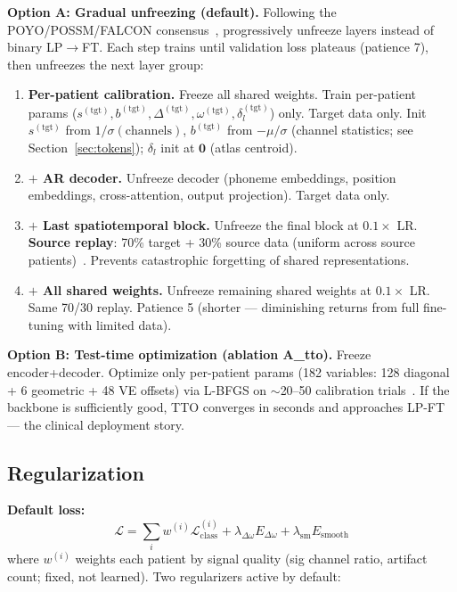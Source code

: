 \documentclass[11pt,letterpaper]{article}
\begin{document}
\textbf{Option A: Gradual unfreezing (default).} Following the POYO/POSSM/FALCON consensus~\cite{ryoo2025possm,karpowicz2024falcon}, progressively unfreeze layers instead of binary LP$\to$FT. Each step trains until validation loss plateaus (patience 7), then unfreezes the next layer group:
\begin{enumerate}[leftmargin=2em]
\item \textbf{Per-patient calibration.} Freeze all shared weights. Train per-patient params ($s^{(\text{tgt})}, b^{(\text{tgt})}, \Delta^{(\text{tgt})}, \omega^{(\text{tgt})}, \delta_l^{(\text{tgt})}$) only. Target data only. Init $s^{(\text{tgt})}$ from $1/\sigma(\text{channels})$, $b^{(\text{tgt})}$ from $-\mu/\sigma$ (channel statistics; see Section~\ref{sec:tokens}); $\delta_l$ init at $\mathbf{0}$ (atlas centroid).
\item \textbf{$+$ AR decoder.} Unfreeze decoder (phoneme embeddings, position embeddings, cross-attention, output projection). Target data only.
\item \textbf{$+$ Last spatiotemporal block.} Unfreeze the final block at $0.1\times$ LR. \textbf{Source replay}: 70\% target + 30\% source data (uniform across source patients)~\cite{levin2026}. Prevents catastrophic forgetting of shared representations.
\item \textbf{$+$ All shared weights.} Unfreeze remaining shared weights at $0.1\times$ LR. Same 70/30 replay. Patience 5 (shorter --- diminishing returns from full fine-tuning with limited data).
\end{enumerate}
\textbf{Option B: Test-time optimization (ablation A\_tto).} Freeze encoder+decoder. Optimize only per-patient params (182 variables: 128 diagonal + 6 geometric + 48 VE offsets) via L-BFGS on ${\sim}$20--50 calibration trials~\cite{hewitt2024}. If the backbone is sufficiently good, TTO converges in seconds and approaches LP-FT --- the clinical deployment story.

\subsection{Regularization}\label{sec:regularizers}

\textbf{Default loss:}
\begin{equation}
\mathcal{L} = \sum_i w^{(i)} \mathcal{L}^{(i)}_{\text{class}} + \lambda_{\Delta\omega} E_{\Delta\omega} + \lambda_{\text{sm}} E_{\text{smooth}}
\end{equation}
where $w^{(i)}$ weights each patient by signal quality (sig channel ratio, artifact count; fixed, not learned). Two regularizers active by default:
\end{document}
